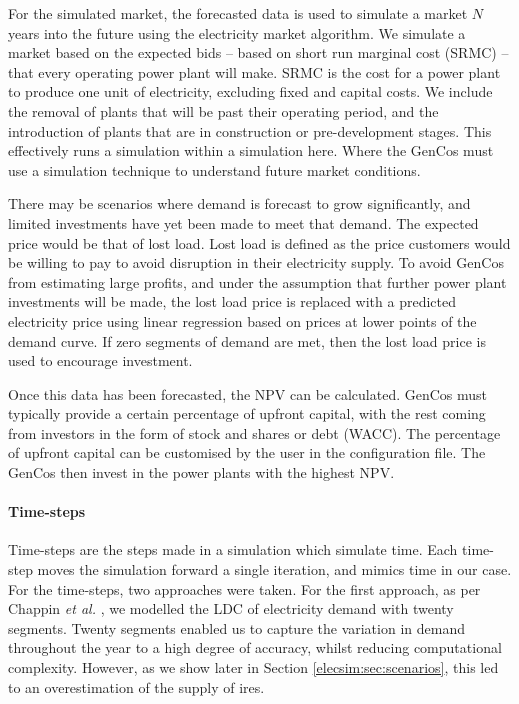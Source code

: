 For the simulated market, the forecasted data is used to simulate a market $N$ years into the future using the electricity market algorithm. We simulate a market based on the expected bids -- based on short run marginal cost (SRMC) -- that every operating power plant will make. SRMC is the cost for a power plant to produce one unit of electricity, excluding fixed and capital costs. We include the removal of plants that will be past their operating period, and the introduction of plants that are in construction or pre-development stages. This effectively runs a simulation within a simulation here. Where the GenCos must use a simulation technique to understand future market conditions.

There may be scenarios where demand is forecast to grow significantly, and limited investments have yet been made to meet that demand. The expected price would be that of lost load. Lost load is defined as the price customers would be willing to pay to avoid disruption in their electricity supply. To avoid GenCos from estimating large profits, and under the assumption that further power plant investments will be made, the lost load price is replaced with a predicted electricity price using linear regression based on prices at lower points of the demand curve. If zero segments of demand are met, then the lost load price is used to encourage investment. 

Once this data has been forecasted, the NPV can be calculated. GenCos must typically provide a certain percentage of upfront capital, with the rest coming from investors in the form of stock and shares or debt (WACC). The percentage of upfront capital can be customised by the user in the configuration file. The GenCos then invest in the power plants with the highest NPV. 


\paragraph{Time-steps} Time-steps are the steps made in a simulation which simulate time. Each time-step moves the simulation forward a single iteration, and mimics time in our case. For the time-steps, two approaches were taken. For the first approach, as per Chappin \textit{et al.} \cite{Chappin2017}, we modelled the LDC of electricity demand with twenty segments. Twenty segments enabled us to capture the variation in demand throughout the year to a high degree of accuracy, whilst reducing computational complexity. However, as we show later in Section \ref{elecsim:sec:scenarios}, this led to an overestimation of the supply of \acrshort{ires}. 

